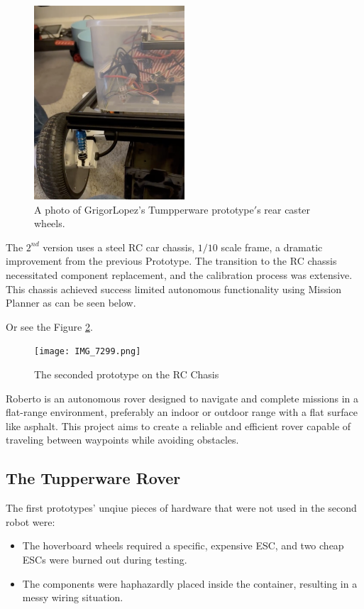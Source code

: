 \documentclass{scrarticle}
\begin{document}
\begin{figure}[h]
  \centering
  \includegraphics[width=0.5\textwidth]{Untitled.png}
  \caption{A photo of GrigorLopez's Tumpperware prototype$'$s rear caster wheels.}
  \label{fig:untitled1}
\end{figure}

The $2^{nd}$ version uses a steel RC car chassis, $1/10$ scale frame, a dramatic improvement from the previous Prototype. The transition to the RC chassis necessitated component replacement, and the calibration process was extensive. This chassis achieved success limited autonomous functionality using Mission Planner as can be seen below. 

Or see the Figure \ref{fig:img7299}. 

\begin{figure}[h]
  \centering
  \texttt{[image: IMG\_7299.png]}
  \caption{The seconded prototype on the RC Chasis}
  \label{fig:img7299}
\end{figure}

Roberto is an autonomous rover designed to navigate and complete missions in a flat-range environment, preferably an indoor or outdoor range with a flat surface like asphalt. This project aims to create a reliable and efficient rover capable of traveling between waypoints while avoiding obstacles.

\subsection{The Tupperware Rover}
The first prototypes' unqiue pieces of hardware that were not used in the second robot were:
\begin{itemize}
    \item The hoverboard wheels required a specific, expensive ESC, and two cheap ESCs were burned out during testing.
    \item The components were haphazardly placed inside the container, resulting in a messy wiring situation.
\end{itemize}
\end{document}
